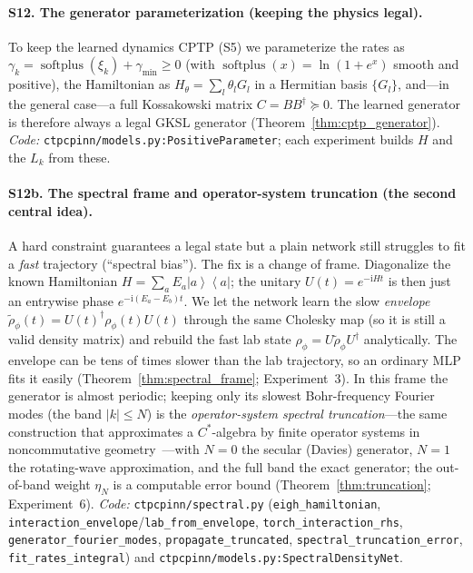 \documentclass[11pt]{article}
\DeclareMathOperator{\softplus}{softplus}
\newcommand{\ii}{\mathrm{i}}
\newcommand{\ket}[1]{\left\lvert #1 \right\rangle}
\newcommand{\bra}[1]{\left\langle #1 \right\rvert}
\newcommand{\proj}[1]{\ket{#1}\!\bra{#1}}
\begin{document}
\paragraph{S12. The generator parameterization (keeping the physics legal).}
To keep the learned dynamics CPTP (S5) we parameterize the rates as $\gamma_k=\softplus(\xi_k)+\gamma_{\min}\ge0$ (with $\softplus(x)=\ln(1+e^x)$ smooth and positive), the Hamiltonian as $H_\theta=\sum_l\theta_l G_l$ in a Hermitian basis $\{G_l\}$, and---in the general case---a full Kossakowski matrix $C=BB^\dagger\succeq0$. The learned generator is therefore always a legal GKSL generator (Theorem~\ref{thm:cptp_generator}). \emph{Code:} \texttt{ctpcpinn/models.py:PositiveParameter}; each experiment builds $H$ and the $L_k$ from these.

\paragraph{S12b. The spectral frame and operator-system truncation (the second central idea).}
A hard constraint guarantees a legal state but a plain network still struggles to fit a \emph{fast} trajectory (``spectral bias''). The fix is a change of frame. Diagonalize the known Hamiltonian $H=\sum_aE_a\proj{a}$; the unitary $U(t)=e^{-\ii Ht}$ is then just an entrywise phase $e^{-\ii(E_a-E_b)t}$. We let the network learn the slow \emph{envelope} $\widetilde\rho_\phi(t)=U(t)^\dagger\rho_\phi(t)U(t)$ through the same Cholesky map (so it is still a valid density matrix) and rebuild the fast lab state $\rho_\phi=U\widetilde\rho_\phi U^\dagger$ analytically. The envelope can be tens of times slower than the lab trajectory, so an ordinary MLP fits it easily (Theorem~\ref{thm:spectral_frame}; Experiment~3). In this frame the generator is almost periodic; keeping only its slowest Bohr-frequency Fourier modes (the band $|k|\le N$) is the \emph{operator-system spectral truncation}---the same construction that approximates a $C^*$-algebra by finite operator systems in noncommutative geometry~\cite{connes2021spectral,hashimoto2024spectral}---with $N{=}0$ the secular (Davies) generator, $N{=}1$ the rotating-wave approximation, and the full band the exact generator; the out-of-band weight $\eta_N$ is a computable error bound (Theorem~\ref{thm:truncation}; Experiment~6). \emph{Code:} \texttt{ctpcpinn/spectral.py} (\texttt{eigh\_hamiltonian}, \texttt{interaction\_envelope}/\texttt{lab\_from\_envelope}, \texttt{torch\_interaction\_rhs}, \texttt{generator\_fourier\_modes}, \texttt{propagate\_truncated}, \texttt{spectral\_truncation\_error}, \texttt{fit\_rates\_integral}) and \texttt{ctpcpinn/models.py:SpectralDensityNet}.
\end{document}
